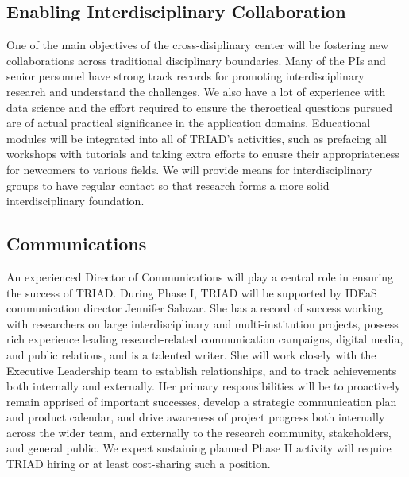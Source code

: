 \documentclass[12pt]{article}
\begin{document}
\vspace*{-1em}

\subsection{Enabling Interdisciplinary Collaboration}
One of the main objectives of the cross-disiplinary center will be fostering new collaborations across traditional disciplinary boundaries.  Many of the PIs and senior personnel have strong track records for promoting interdisciplinary research and understand the challenges.  We also have a lot of experience with data science and the effort required to ensure the theroetical questions pursued are of actual practical significance in the application domains.  Educational modules will be integrated into all of TRIAD's activities, such as prefacing all workshops with tutorials and taking extra efforts to enusre their appropriateness for newcomers to various fields.  We will provide means for interdisciplinary groups to have regular contact so that research forms a more solid interdisciplinary foundation.




\subsection{Communications}
\label{sec:communication}
An experienced Director of Communications will play a central role in
ensuring the success of TRIAD. During Phase I, TRIAD will be supported by
IDEaS communication director Jennifer Salazar. She has a record of success working with researchers on large interdisciplinary and multi-institution projects, possess rich experience leading research-related communication campaigns, digital media, and public relations, and is a talented writer. She will work closely with the Executive Leadership team to establish relationships, and to track achievements both internally and externally.
Her primary responsibilities will be to proactively remain apprised of important successes, develop a strategic communication plan and %
product calendar, and drive awareness of project progress both internally across the wider team, and externally to the research community, stakeholders, and general public.
We expect sustaining planned Phase II activity will require TRIAD hiring or at least
cost-sharing such a position.
\end{document}
